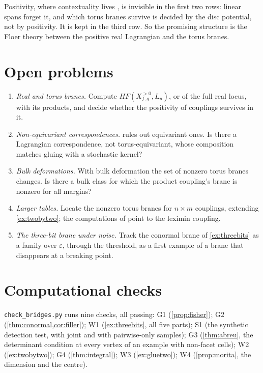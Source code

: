 \documentclass[11pt]{article}
\theoremstyle{definition}
\theoremstyle{remark}
\begin{document}
Positivity, where contextuality lives \cite[Cor.~5.3]{Algebras}, is invisible in the first two rows: linear spans forget it, and
which torus branes survive is decided by the disc potential, not by positivity. It is kept in the third row. So the promising
structure is the Floer theory between the positive real Lagrangian and the torus branes.

\section{Open problems}\label{sec:open}

\begin{enumerate}[leftmargin=*]
\item \emph{Real and torus branes.} Compute $HF(X^{>0}_{f,g},L_u)$, or of the full real locus, with its products, and decide whether the
  positivity of couplings survives in it.
\item \emph{Non-equivariant correspondences.}  rules out equivariant ones. Is there a Lagrangian correspondence, not
  torus-equivariant, whose composition matches gluing with a stochastic kernel?
\item \emph{Bulk deformations.} With bulk deformation the set of nonzero torus branes changes. Is there a bulk class for which the
  product coupling's brane is nonzero for all margins?
\item \emph{Larger tables.} Locate the nonzero torus branes for $n\times m$ couplings, extending \cref{ex:twobytwo}; the computations of
  \cite[Obs.~10.10]{Conditionals} point to the leximin coupling.
\item \emph{The three-bit brane under noise.} Track the conormal brane of \cref{ex:threebits} as a family over $\varepsilon$, through the
  threshold, as a first example of a brane that disappears at a breaking point.
\end{enumerate}

\section{Computational checks}\label{sec:code}

\texttt{check\_bridges.py} runs nine checks, all passing: G1 (\cref{prop:fisher}); G2 (\cref{thm:conormal,cor:filler}); W1
(\cref{ex:threebits}, all five parts); S1 (the synthetic detection test, with joint and with pairwise-only samples); G3 (\cref{thm:abreu}, the determinant condition at every vertex
of an example with non-facet cells); W2 (\cref{ex:twobytwo}); G4 (\cref{thm:integral}); W3 (\cref{ex:gluetwo}); W4 (\cref{prop:morita}, the
dimension and the centre).
\end{document}
